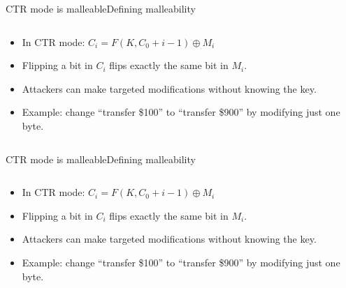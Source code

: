 \documentclass[aspectratio=169, lualatex, handout]{beamer}
\begin{document}
\begin{frame}{CTR mode is malleable}{Defining malleability}
	\begin{columns}[c]
		\begin{column}{0.5\textwidth}
			\begin{itemize}
				\item In CTR mode: $C_i = F(K, C_0 + i - 1) \oplus M_i$
				\item Flipping a bit in $C_i$ flips exactly the same bit in $M_i$.
				\item Attackers can make targeted modifications without knowing the key.
				\item Example: change ``transfer \$100'' to ``transfer \$900'' by modifying just one byte.
			\end{itemize}
		\end{column}
		\begin{column}{0.5\textwidth}
		\end{column}
	\end{columns}
\end{frame}

\begin{frame}{CTR mode is malleable}{Defining malleability}
	\begin{columns}[c]
		\begin{column}{0.5\textwidth}
			\begin{itemize}
				\item In CTR mode: $C_i = F(K, C_0 + i - 1) \oplus M_i$
				\item Flipping a bit in $C_i$ flips exactly the same bit in $M_i$.
				\item Attackers can make targeted modifications without knowing the key.
				\item Example: change ``transfer \$100'' to ``transfer \$900'' by modifying just one byte.
			\end{itemize}
		\end{column}
		\begin{column}{0.5\textwidth}
		\end{column}
	\end{columns}
\end{frame}
\end{document}
